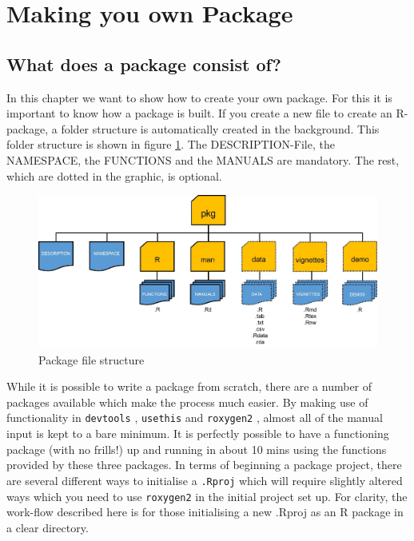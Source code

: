 \documentclass[a4paper,11pt]{article}
\begin{document}
\section{Making you own Package}
\subsection{What does a package consist of?}
In this chapter we want to show how to create your own package. For this it is important to know how a package is built. If you create a new file to create an R-package, a folder structure is automatically created in the background. This folder structure is shown in figure \ref{structure}. The DESCRIPTION-File, the NAMESPACE, the FUNCTIONS and the MANUALS are mandatory. The rest, which are dotted in the graphic, is optional.
\\
\begin{figure}
\begin{center}
	\includegraphics[width=.7\linewidth]{stott}
	\caption{Package file structure}
	\label{structure}
\end{center}  
\end{figure}

While it is possible to write a package from scratch, there are a number of packages available which make the process much easier. By making use of functionality in \texttt{devtools} \cite{devtools}, \texttt{usethis} \cite{usethis} and \texttt{roxygen2} \cite{roxygen2}, almost all of the manual input is kept to a bare minimum. It is perfectly possible to have a functioning package (with no frills!) up and running in about 10 mins using the functions provided by these three packages. In terms of beginning a package project, there are several different ways to initialise a \texttt{.Rproj} which will require slightly altered ways which you need to use \texttt{roxygen2} in the initial project set up. For clarity, the work-flow described here is for those initialising a new .Rproj as an R package in a clear directory.
\end{document}
